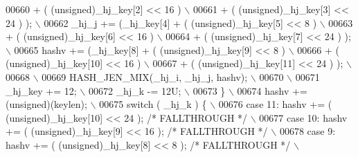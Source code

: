 \begin{DoxyCode}
{{{{{{{{00660 \textcolor{preprocessor}{        + ( (unsigned)\_hj\_key[2] << 16 )                                         \(\backslash\)}
00661 \textcolor{preprocessor}{        + ( (unsigned)\_hj\_key[3] << 24 ) );                                      \(\backslash\)}
00662 \textcolor{preprocessor}{    \_hj\_j +=    (\_hj\_key[4] + ( (unsigned)\_hj\_key[5] << 8 )                      \(\backslash\)}
00663 \textcolor{preprocessor}{        + ( (unsigned)\_hj\_key[6] << 16 )                                         \(\backslash\)}
00664 \textcolor{preprocessor}{        + ( (unsigned)\_hj\_key[7] << 24 ) );                                      \(\backslash\)}
00665 \textcolor{preprocessor}{    hashv += (\_hj\_key[8] + ( (unsigned)\_hj\_key[9] << 8 )                         \(\backslash\)}
00666 \textcolor{preprocessor}{        + ( (unsigned)\_hj\_key[10] << 16 )                                        \(\backslash\)}
00667 \textcolor{preprocessor}{        + ( (unsigned)\_hj\_key[11] << 24 ) );                                     \(\backslash\)}
00668 \textcolor{preprocessor}{                                                                                 \(\backslash\)}
00669 \textcolor{preprocessor}{     HASH\_JEN\_MIX(\_hj\_i, \_hj\_j, hashv);                                          \(\backslash\)}
00670 \textcolor{preprocessor}{                                                                                 \(\backslash\)}
00671 \textcolor{preprocessor}{     \_hj\_key += 12;                                                              \(\backslash\)}
00672 \textcolor{preprocessor}{     \_hj\_k -= 12U;                                                               \(\backslash\)}
00673 \textcolor{preprocessor}{  \}                                                                              \(\backslash\)}
00674 \textcolor{preprocessor}{  hashv += (unsigned)(keylen);                                                   \(\backslash\)}
00675 \textcolor{preprocessor}{  switch ( \_hj\_k ) \{                                                             \(\backslash\)}
00676 \textcolor{preprocessor}{    case 11: hashv += ( (unsigned)\_hj\_key[10] << 24 ); }\textcolor{comment}{/* FALLTHROUGH */}\textcolor{preprocessor}{         \(\backslash\)}
00677 \textcolor{preprocessor}{    case 10: hashv += ( (unsigned)\_hj\_key[9] << 16 );  }\textcolor{comment}{/* FALLTHROUGH */}\textcolor{preprocessor}{         \(\backslash\)}
00678 \textcolor{preprocessor}{    case 9:  hashv += ( (unsigned)\_hj\_key[8] << 8 );   }\textcolor{comment}{/* FALLTHROUGH */}\textcolor{preprocessor}{         \(\backslash\)}
}}}}}}}}
\end{DoxyCode}
